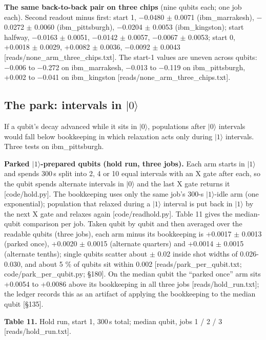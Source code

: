 \documentclass[11pt]{article}
\begin{document}
\textbf{The same back-to-back pair on three chips} (nine qubits each; one job each). Second readout minus first: start 1, \(-\)0.0480 \(\pm\) 0.0071 (ibm\_marrakesh), \(-\)0.0272 \(\pm\) 0.0060 (ibm\_pittsburgh), \(-\)0.0204 \(\pm\) 0.0053 (ibm\_kingston); start halfway, \(-\)0.0163 \(\pm\) 0.0051, \(-\)0.0142 \(\pm\) 0.0057, \(-\)0.0067 \(\pm\) 0.0053; start 0, +0.0018 \(\pm\) 0.0029, +0.0082 \(\pm\) 0.0036, \(-\)0.0092 \(\pm\) 0.0043 {[}reads/none\_arm\_three\_chips.txt{]}. The start-1 values are uneven across qubits: \(-\)0.006 to \(-\)0.272 on ibm\_marrakesh, \(-\)0.013 to \(-\)0.119 on ibm\_pittsburgh, +0.002 to \(-\)0.041 on ibm\_kingston {[}reads/none\_arm\_three\_chips.txt{]}.

\subsection{The park: intervals in \(|0\rangle\)}
If a qubit's decay advanced while it sits in \(|0\rangle\), populations after \(|0\rangle\) intervals would fall below bookkeeping in which relaxation acts only during \(|1\rangle\) intervals. Three tests on ibm\_pittsburgh.

\textbf{Parked \(|1\rangle\)-prepared qubits (hold run, three jobs).} Each arm starts in \(|1\rangle\) and spends 300\,\textmu s split into 2, 4 or 10 equal intervals with an X gate after each, so the qubit spends alternate intervals in \(|0\rangle\) and the last X gate returns it {[}code/hold.py{]}. The bookkeeping uses only the same job's 300-\textmu s \(|1\rangle\)-idle arm (one exponential); population that relaxed during a \(|1\rangle\) interval is put back in \(|1\rangle\) by the next X gate and relaxes again {[}code/readhold.py{]}. Table 11 gives the median-qubit comparison per job. Taken qubit by qubit and then averaged over the readable qubits (three jobs), each arm minus its bookkeeping is +0.0017 \(\pm\) 0.0013 (parked once), +0.0020 \(\pm\) 0.0015 (alternate quarters) and +0.0014 \(\pm\) 0.0015 (alternate tenths); single qubits scatter about \(\pm\) 0.02 inside shot widths of 0.026-0.030, and about 5 \% of qubits sit within 0.002 {[}reads/park\_per\_qubit.txt; code/park\_per\_qubit.py; \S{}180{]}. On the median qubit the ``parked once'' arm sits +0.0054 to +0.0086 above its bookkeeping in all three jobs {[}reads/hold\_run.txt{]}; the ledger records this as an artifact of applying the bookkeeping to the median qubit {[}\S{}135{]}.

\textbf{Table 11.} Hold run, start 1, 300\,\textmu s total; median qubit, jobs 1 / 2 / 3 {[}reads/hold\_run.txt{]}.
\end{document}
